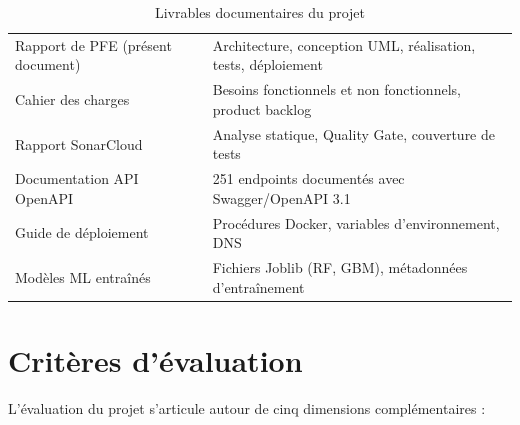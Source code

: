 \begin{table}[H]
  \centering
  \caption{Livrables documentaires du projet}
  \label{tab:livrables_doc}
  \begin{tabularx}{\textwidth}{L{5cm}X}
    \toprule
     &  \\
    \midrule
    Rapport de PFE (présent document) & Architecture, conception UML, réalisation, tests, déploiement \\
    Cahier des charges                & Besoins fonctionnels et non fonctionnels, product backlog \\
    Rapport SonarCloud                & Analyse statique, Quality Gate, couverture de tests \\
    Documentation API OpenAPI         & 251 endpoints documentés avec Swagger/OpenAPI 3.1 \\
    Guide de déploiement              & Procédures Docker, variables d'environnement, DNS \\
    Modèles ML entraînés             & Fichiers Joblib (RF, GBM), métadonnées d'entraînement \\
    \bottomrule
  \end{tabularx}
\end{table}

\section{Critères d'évaluation}

L'évaluation du projet s'articule autour de cinq dimensions complémentaires :

